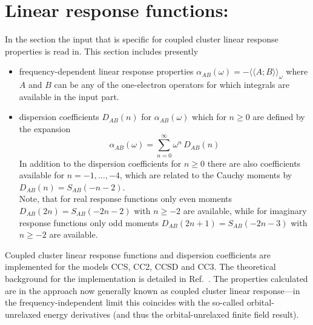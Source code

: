 
\section{Linear response functions: }\label{sec:cclr}

In the  section the input that is
specific for coupled cluster linear response properties is read in. 
This section includes presently 
\begin{itemize}
\item frequency-dependent linear response properties 
      $\alpha_{AB}(\omega)  = - \langle\langle A; B \rangle\rangle_\omega$
      where $A$ and $B$ can be any of the one-electron
      operators for which integrals are available in the 
       input part.
\item dispersion coefficients $D_{AB}(n)$ for $\alpha_{AB}(\omega)$
      which for $n \ge 0$ are defined by the expansion
      $$ \alpha_{AB}(\omega) = \sum_{n=0}^{\infty} \omega^n \, D_{AB}(n) $$
      In addition to the dispersion coefficients for $n \ge 0$
      there are also coefficients available for $ n = -1, \ldots, -4$,
      which are related to the Cauchy moments
       by $ D_{AB}(n) = S_{AB}(-n-2)$.
      \\
      Note, that for real response functions only even moments
      $D_{AB}(2n) = S_{AB}(-2n-2)$ with $n \ge -2$ are available,
      while for imaginary response functions only odd moments
      $D_{AB}(2n+1) = S_{AB}(-2n-3)$ with $n \ge -2$ are available.
\end{itemize}

Coupled cluster linear response functions and dispersion coefficients
are implemented for the models CCS, CC2, CCSD and CC3. 
The theoretical background for the implementation is detailed in Ref.\ \cite{Christiansen:CCLR,Christiansen:QEL,Haettig:CAUCHY,Haettig:DIPGRA}.
The properties calculated are in the approach now generally known as coupled cluster 
linear response---in the frequency-independent limit this coincides with the so-called 
orbital-unrelaxed energy derivatives (and thus the orbital-unrelaxed finite field result).

